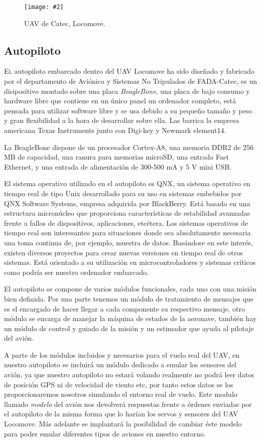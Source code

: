 \documentclass[12pt,a4paper,spanish]{book} %
\newcommand{\imgCentrada}[3]{
\begin{figure}[H]
\begin{center}
\texttt{[image: \#2]}
\caption{#3}
\label{#1}
\end{center}
\end{figure}
}
\begin{document}
\imgCentrada{fig.2.26}{img/locomove.eps}{UAV de Catec, Locomove.}

\newpage

\subsection{Autopiloto}

\lettrine{E}{l} autopiloto embarcado dentro del UAV Locomove ha sido diseñado y fabricado por el departamento de Aviónica y Sistemas No Tripulados de FADA-Catec, es un disipositivo montado sobre una placa \emph{BeagleBone}, una placa de bajo consumo y hardware libre que contiene en un único panel un ordenador completo, está pensada para utilizar software libre y se usa debido a su pequeño tamaño y peso y gran flexibilidad a la hora de desarrollar sobre ella. Las barrica la empresa americana Texas Instruments junto con Digi-key y Newmark element14.

La BeagleBone dispone de un procesador Cortex-A8, una memoria DDR2 de 256 MB de capacidad, una ranura para memorias microSD, una entrada Fast Ethernet, y una entrada de alimentación de 300-500 mA y 5 V mini USB.

El sistema operativo utilizado en el autopiloto es QNX, un sistema operativo en tiempo real de tipo Unix desarrollado para su uso en sistemas embebidos por QNX Software Systems, empresa adquirida por BlackBerry. Está basado en una estructura micronúcleo que proporciona características de estabilidad avanzadas frente a fallos de dispositivos, aplicaciones, etcétera. Los sistemas operativos de tiempo real son interesantes para situaciones donde sea absolutamente necesaria una toma continua de, por ejemplo, muestra de datos. Basándose en este interés, existen diversos proyectos para crear nuevas versiones en tiempo real de otros sistemas. Está orientado a su utilización en microcontroladores y sistemas críticos como podría ser nuestro ordenador embarcado.

El autopiloto se compone de varios módulos funcionales, cada uno con una misión bien definida. Por una parte tenemos un módulo de tratamiento de mensajes que es el encargado de hacer llegar a cada componente su respectivo mensaje, otro módulo se encarga de manejar la máquina de estados de la aeronave, también hay un módulo de control y guiado de la misión y un estimador que ayuda al pilotaje del avión. 

A parte de los módulos incluidos y necesarios para el vuelo real del UAV, en nuestro autopiloto se incluirá un módulo dedicado a emular los sensores del avión, ya que nuestro autopiloto no estará volando realmente no podrá leer datos de posición GPS ni de velocidad de viento etc, por tanto estos datos se los proporcionaremos nosotros simulando el entorno real de vuelo. Este modulo llamado \emph{modelo} del avión nos devolverá respuestas frente a órdenes enviadas por el autopiloto de la misma forma que lo harían los servos y sensores del UAV Locomove. Más adelante se implantará la posibilidad de cambiar éste modelo para poder emular diferentes tipos de aviones en nuestro entorno.
\end{document}
